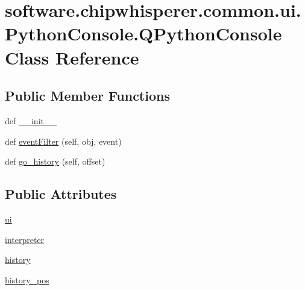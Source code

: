 \hypertarget{classsoftware_1_1chipwhisperer_1_1common_1_1ui_1_1PythonConsole_1_1QPythonConsole}{}\section{software.\+chipwhisperer.\+common.\+ui.\+Python\+Console.\+Q\+Python\+Console Class Reference}
\label{classsoftware_1_1chipwhisperer_1_1common_1_1ui_1_1PythonConsole_1_1QPythonConsole}
\subsection*{Public Member Functions}
\begin{DoxyCompactItemize}
\item 
def \hyperlink{classsoftware_1_1chipwhisperer_1_1common_1_1ui_1_1PythonConsole_1_1QPythonConsole_a515d570004b0b948e0e0a074ba03d8a5}{\+\_\+\+\_\+init\+\_\+\+\_\+}
\item 
def \hyperlink{classsoftware_1_1chipwhisperer_1_1common_1_1ui_1_1PythonConsole_1_1QPythonConsole_a27269a59718f8d58bc059223cfde1db2}{event\+Filter} (self, obj, event)
\item 
def \hyperlink{classsoftware_1_1chipwhisperer_1_1common_1_1ui_1_1PythonConsole_1_1QPythonConsole_a822e9b2d88f4b5380397f2e2e34afeb2}{go\+\_\+history} (self, offset)
\end{DoxyCompactItemize}
\subsection*{Public Attributes}
\begin{DoxyCompactItemize}
\item 
\hyperlink{classsoftware_1_1chipwhisperer_1_1common_1_1ui_1_1PythonConsole_1_1QPythonConsole_a52233b537b052cef5b3bcfceb8d7b4f1}{ui}
\item 
\hyperlink{classsoftware_1_1chipwhisperer_1_1common_1_1ui_1_1PythonConsole_1_1QPythonConsole_ab19e0f45f1ae712a330044f7d83f65e9}{interpreter}
\item 
\hyperlink{classsoftware_1_1chipwhisperer_1_1common_1_1ui_1_1PythonConsole_1_1QPythonConsole_a7e67c9a26d22cb7481508cd1bd361ffd}{history}
\item 
\hyperlink{classsoftware_1_1chipwhisperer_1_1common_1_1ui_1_1PythonConsole_1_1QPythonConsole_a3f733ebc187846ffaae47c80b1b8bbbd}{history\+\_\+pos}
\end{DoxyCompactItemize}


